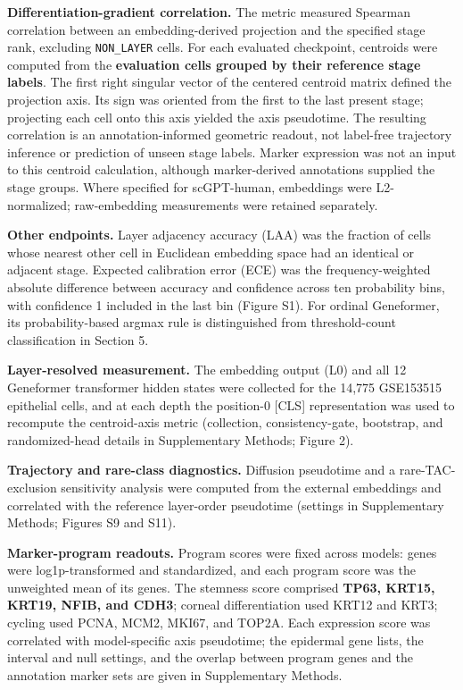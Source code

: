 \documentclass[12pt,letterpaper]{article}
\begin{document}
\textbf{Differentiation-gradient correlation.} The metric measured Spearman correlation between an embedding-derived projection and the specified stage rank, excluding \texttt{NON\_\allowbreak LAYER} cells. For each evaluated checkpoint, centroids were computed from the \textbf{evaluation cells grouped by their reference stage labels}. The first right singular vector of the centered centroid matrix defined the projection axis. Its sign was oriented from the first to the last present stage; projecting each cell onto this axis yielded the axis pseudotime. The resulting correlation is an annotation-informed geometric readout, not label-free trajectory inference or prediction of unseen stage labels. Marker expression was not an input to this centroid calculation, although marker-derived annotations supplied the stage groups. Where specified for scGPT-human, embeddings were L2-normalized; raw-embedding measurements were retained separately.

\textbf{Other endpoints.} Layer adjacency accuracy (LAA) was the fraction of cells whose nearest other cell in Euclidean embedding space had an identical or adjacent stage. Expected calibration error (ECE) was the frequency-weighted absolute difference between accuracy and confidence across ten probability bins, with confidence 1 included in the last bin (Figure S1). For ordinal Geneformer, its probability-based argmax rule is distinguished from threshold-count classification in Section 5.

\textbf{Layer-resolved measurement.} The embedding output (L0) and all 12 Geneformer transformer hidden states were collected for the 14,775 GSE153515 epithelial cells, and at each depth the position-0 [CLS] representation was used to recompute the centroid-axis metric (collection, consistency-gate, bootstrap, and randomized-head details in Supplementary Methods; Figure 2).

\textbf{Trajectory and rare-class diagnostics.} Diffusion pseudotime and a rare-TAC-exclusion sensitivity analysis were computed from the external embeddings and correlated with the reference layer-order pseudotime (settings in Supplementary Methods; Figures S9 and S11).

\textbf{Marker-program readouts.} Program scores were fixed across models: genes were log1p-transformed and standardized, and each program score was the unweighted mean of its genes. The stemness score comprised \textbf{TP63, KRT15, KRT19, NFIB, and CDH3}; corneal differentiation used KRT12 and KRT3; cycling used PCNA, MCM2, MKI67, and TOP2A. Each expression score was correlated with model-specific axis pseudotime; the epidermal gene lists, the interval and null settings, and the overlap between program genes and the annotation marker sets are given in Supplementary Methods.
\end{document}
